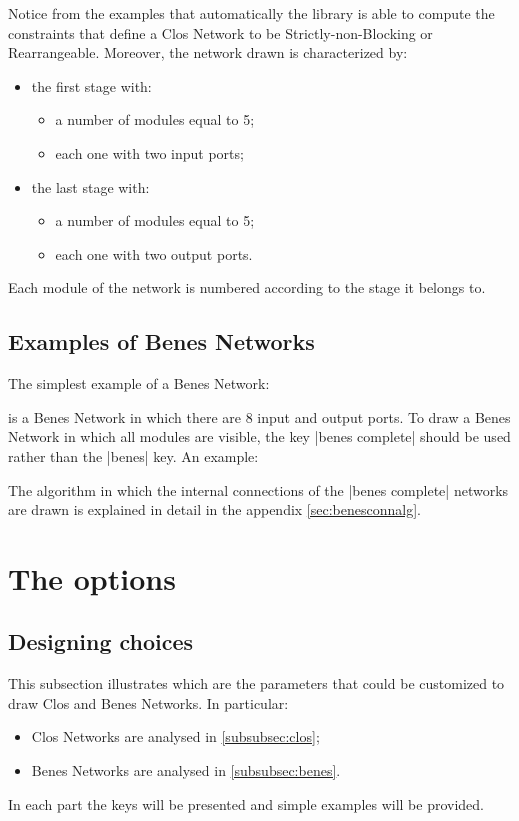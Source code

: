 \documentclass{ltxdoc} %
\begin{document}
Notice from the examples that automatically the library is able to compute the constraints that define a Clos Network to be Strictly-non-Blocking or Rearrangeable. Moreover, the network drawn is characterized by:
\begin{itemize}
\item the first stage with:
\begin{itemize}
\item a number of modules equal to 5;
\item each one with two input ports;
\end{itemize}
\item the last stage with:
\begin{itemize}
\item a number of modules equal to 5;
\item each one with two output ports.
\end{itemize}
\end{itemize}
Each module of the network is numbered according to the stage it belongs to.

\subsection{Examples of Benes Networks}

The simplest example of a Benes Network:
\begin{codeexample}[]
\begin{tikzpicture}
    \node[benes] {};
\end{tikzpicture}
\end{codeexample}
is a Benes Network in which there are 8 input and output ports. To draw a Benes Network in which all modules are visible, the key |benes complete| should be used rather than the |benes| key. An example:

\begin{codeexample}[]
\end{codeexample}

The algorithm in which the internal connections of the |benes complete| networks are drawn is explained in detail in the appendix \ref{sec:benesconnalg}.

\section{The options}
\subsection{Designing choices}
This subsection illustrates which are the parameters that could be customized to draw Clos and Benes Networks. In particular:
\begin{itemize}
\item Clos Networks are analysed in \ref{subsubsec:clos};
\item Benes Networks are analysed in \ref{subsubsec:benes}.
\end{itemize}
In each part the keys will be presented and simple examples will be provided. 
\end{document}
